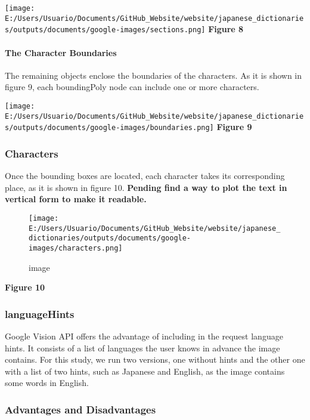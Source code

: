 \documentclass[
]{article}
\begin{document}
\texttt{[image: E:/Users/Usuario/Documents/GitHub\_Website/website/japanese\_dictionaries/outputs/documents/google-images/sections.png]}
\textbf{Figure 8}

\hypertarget{the-character-boundaries-1}{%
\paragraph{The Character Boundaries}\label{the-character-boundaries-1}}

The remaining objects enclose the boundaries of the characters. As it is
shown in figure 9, each boundingPoly node can include one or more
characters.

\texttt{[image: E:/Users/Usuario/Documents/GitHub\_Website/website/japanese\_dictionaries/outputs/documents/google-images/boundaries.png]}
\textbf{Figure 9}

\hypertarget{characters-1}{%
\subsubsection{Characters}\label{characters-1}}

Once the bounding boxes are located, each character takes its
corresponding place, as it is shown in figure 10. \textbf{Pending find a
way to plot the text in vertical form to make it readable.}

\begin{figure}
\centering
\texttt{[image: E:/Users/Usuario/Documents/GitHub\_Website/website/japanese\_dictionaries/outputs/documents/google-images/characters.png]}
\caption{image}
\end{figure}

\textbf{Figure 10}

\hypertarget{languagehints}{%
\subsubsection{languageHints}\label{languagehints}}

Google Vision API offers the advantage of including in the request
language hints. It consists of a list of languages the user knows in
advance the image contains. For this study, we run two versions, one
without hints and the other one with a list of two hints, such as
Japanese and English, as the image contains some words in English.

\hypertarget{advantages-and-disadvantages-1}{%
\subsubsection{Advantages and
Disadvantages}\label{advantages-and-disadvantages-1}}
\end{document}
